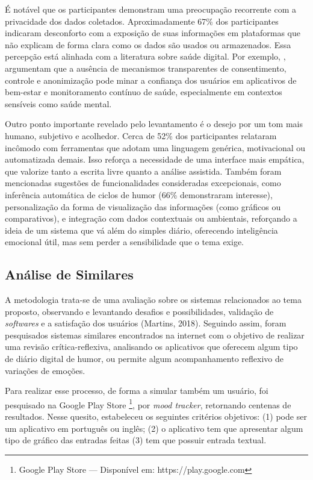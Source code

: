 É notável que os participantes demonstram uma preocupação recorrente com a
privacidade dos dados coletados. Aproximadamente 67\% dos participantes
indicaram desconforto com a exposição de suas informações em plataformas que
não explicam de forma clara como os dados são usados ou armazenados. Essa
percepção está alinhada com a literatura sobre saúde digital. Por exemplo,
\cite{Iwaya:22}, argumentam que a ausência de mecanismos transparentes de
consentimento, controle e anonimização pode minar a confiança dos usuários em
aplicativos de bem-estar e monitoramento contínuo de saúde, especialmente em
contextos sensíveis como saúde mental.

Outro ponto importante revelado pelo levantamento é o desejo por um tom mais
humano, subjetivo e acolhedor. Cerca de 52\% dos participantes relataram
incômodo com ferramentas que adotam uma linguagem genérica, motivacional ou
automatizada demais. Isso reforça a necessidade de uma interface mais empática,
que valorize tanto a escrita livre quanto a análise assistida. Também foram
mencionadas sugestões de funcionalidades consideradas excepcionais, como
inferência automática de ciclos de humor (66\% demonstraram interesse),
personalização da forma de visualização das informações (como gráficos ou
comparativos), e integração com dados contextuais ou ambientais, reforçando a
ideia de um sistema que vá além do simples diário, oferecendo inteligência
emocional útil, mas sem perder a sensibilidade que o tema exige.

\subsection{Análise de Similares}

A metodologia trata-se de uma avaliação sobre os sistemas relacionados ao tema
proposto, observando e levantando desafios e possibilidades, validação de
\textit{softwares} e a satisfação dos usuários (Martins, 2018). Seguindo assim,
foram pesquisados sistemas similares encontrados na internet com o objetivo de
realizar uma revisão crítica-reflexiva, analisando os aplicativos que oferecem
algum tipo de diário digital de humor, ou permite algum acompanhamento
reflexivo de variações de emoções.

Para realizar esse processo, de forma a simular também um usuário, foi
pesquisado na Google Play Store \footnote{Google Play Store --- Disponível em:
https://play.google.com}, por \textit{mood tracker}, retornando centenas de
resultados. Nesse quesito, estabeleceu os seguintes critérios objetivos: (1)
pode ser um aplicativo em português ou inglês; (2) o aplicativo tem que
apresentar algum tipo de gráfico das entradas feitas (3) tem que possuir
entrada textual.

